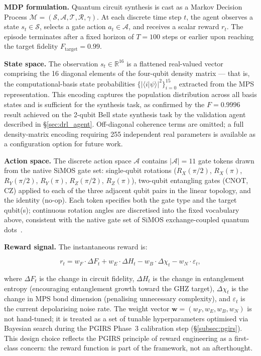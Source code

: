 \textbf{MDP formulation.} Quantum circuit synthesis is cast as a Markov Decision Process $\mathcal{M} = (\mathcal{S}, \mathcal{A}, \mathcal{T}, \mathcal{R}, \gamma)$. At each discrete time step $t$, the agent observes a state $s_t \in \mathcal{S}$, selects a gate action $a_t \in \mathcal{A}$, and receives a scalar reward $r_t$. The episode terminates after a fixed horizon of $T = 100$ steps or earlier upon reaching the target fidelity $F_\text{target} = 0.99$.

\textbf{State space.} The observation $s_t \in \mathbb{R}^{16}$ is a flattened real-valued vector comprising the 16 diagonal elements of the four-qubit density matrix — that is, the computational-basis state probabilities $\{|\langle i|\psi\rangle|^2\}_{i=0}^{15}$ extracted from the MPS representation. This encoding captures the population distribution across all basis states and is sufficient for the synthesis task, as confirmed by the $F = 0.9996$ result achieved on the 2-qubit Bell state synthesis task by the validation agent described in \S\ref{sec:drl_agent}. Off-diagonal coherence terms are omitted; a full density-matrix encoding requiring 255 independent real parameters is available as a configuration option for future work.

\textbf{Action space.} The discrete action space $\mathcal{A}$ contains $|\mathcal{A}| = 11$ gate tokens drawn from the native SiMOS gate set: single-qubit rotations ($R_X(\pi/2)$, $R_X(\pi)$, $R_Y(\pi/2)$, $R_Y(\pi)$, $R_Z(\pi/2)$, $R_Z(\pi)$), two-qubit entangling gates (CNOT, CZ) applied to each of the three adjacent qubit pairs in the linear topology, and the identity (no-op). Each token specifies both the gate type and the target qubit(s); continuous rotation angles are discretised into the fixed vocabulary above, consistent with the native gate set of SiMOS exchange-coupled quantum dots~\cite{Veldhorst2015}.

\textbf{Reward signal.} The instantaneous reward is:

\begin{equation}
  r_t = w_F \cdot \Delta F_t + w_E \cdot \Delta H_t - w_B \cdot \Delta \chi_t - w_N \cdot \varepsilon_t,
  \label{eq:reward}
\end{equation}

where $\Delta F_t$ is the change in circuit fidelity, $\Delta H_t$ is the change in entanglement entropy (encouraging entanglement growth toward the GHZ target), $\Delta \chi_t$ is the change in MPS bond dimension (penalising unnecessary complexity), and $\varepsilon_t$ is the current depolarising noise rate. The weight vector $\mathbf{w} = (w_F, w_E, w_B, w_N)$ is not hand-tuned; it is treated as a set of tunable hyperparameters optimised via Bayesian search during the PGIRS Phase~3 calibration step (\S\ref{subsec:pgirs}). This design choice reflects the PGIRS principle of reward engineering as a first-class concern: the reward function is part of the framework, not an afterthought.

